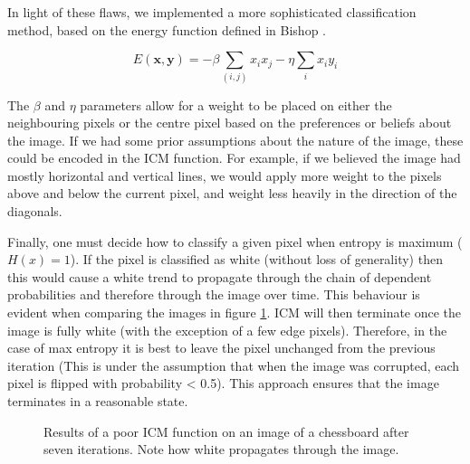 \documentclass[10pt, a4paper, twocolumn]{article} %
\begin{document}
In light of these flaws, we implemented a more sophisticated classification method, based on the energy function defined in Bishop \cite{Bishop:2006ui}.

\begin{equation}
    E(\mathbf{x}, \mathbf{y}) = - \beta \sum_{(i,j)}x_i x_j - \eta \sum_{i}x_i y_i
\end{equation}

The $\beta$ and $\eta$ parameters allow for a weight to be placed on either the neighbouring pixels or the centre pixel based on the preferences or beliefs about the image. If we had some prior assumptions about the nature of the image, these could be encoded in the ICM function. For example, if we believed the image had mostly horizontal and vertical lines, we would apply more weight to the pixels above and below the current pixel, and weight less heavily in the direction of the diagonals.

Finally, one must decide how to classify a given pixel when entropy is maximum ($H(x) = 1$). If the pixel is classified as white (without loss of generality) then this would cause a white trend to propagate through the chain of dependent probabilities and therefore through the image over time. This behaviour is evident when comparing the images in figure \ref{fig:chessboard}. ICM will then terminate once the image is fully white (with the exception of a few edge pixels). Therefore, in the case of max entropy it is best to leave the pixel unchanged from the previous iteration (This is under the assumption that when the image was corrupted, each pixel is flipped with probability < 0.5). This approach ensures that the image terminates in a reasonable state.


\begin{figure}
    \centering
    \qquad
    \caption{Results of a poor ICM function on an image of a chessboard after seven iterations. Note how white propagates through the image.}
    \label{fig:chessboard}%
\end{figure}
\end{document}
